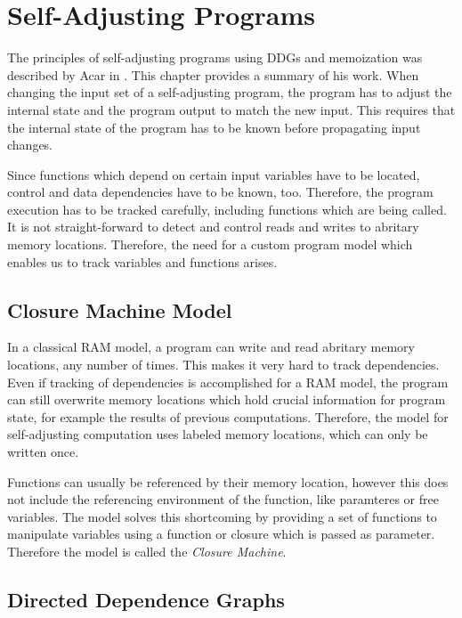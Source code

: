 
\chapter{Self-Adjusting Programs}
\label{ch:self_adjusting}

The principles of self-adjusting programs using DDGs and memoization was described by Acar in \cite{Acar2005thesis}. This chapter provides a summary of his work. 
When changing the input set of a self-adjusting program, the program has to adjust the internal state and the program output to match the new input. This requires that the internal state of the program has to be known before propagating input changes. 

Since functions which depend on certain input variables have to be located, control and data dependencies have to be known, too. Therefore, the program execution has to be tracked carefully, including functions which are being called. It is not straight-forward to detect and control reads and writes to abritary memory locations. Therefore, the need for a custom program model which enables us to track variables and functions arises.

\section{Closure Machine Model}

In a classical RAM model, a program can write and read abritary memory locations, any number of times. This makes it very hard to track dependencies. Even if tracking of dependencies is accomplished for a RAM model, the program can still overwrite memory locations which hold crucial information for program state, for example the results of previous computations. Therefore, the model for self-adjusting computation uses labeled memory locations, which can only be written once. 

Functions can usually be referenced by their memory location, however this does not include the referencing environment of the function, like paramteres or free variables. The model solves this shortcoming by providing a set of functions to manipulate variables using a function or closure which is passed as parameter. Therefore the model is called the \textit{Closure Machine}. 

\section{Directed Dependence Graphs}


